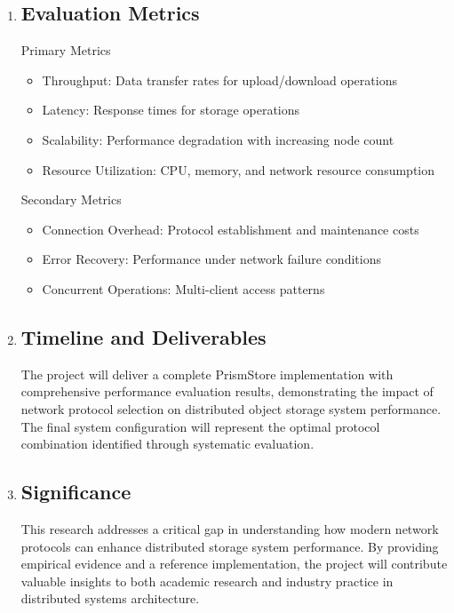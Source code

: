 \documentclass[12pt]{article}
\begin{document}
\begin{enumerate}
    \item \subsection*{Evaluation Metrics}
        Primary Metrics
        \begin{itemize}
            \item Throughput: Data transfer rates for upload/download operations
            \item Latency: Response times for storage operations
            \item Scalability: Performance degradation with increasing node count
            \item Resource Utilization: CPU, memory, and network resource consumption
        \end{itemize}
        Secondary Metrics
        \begin{itemize}
            \item Connection Overhead: Protocol establishment and maintenance costs
            \item Error Recovery: Performance under network failure conditions
            \item Concurrent Operations: Multi-client access patterns
        \end{itemize}

    \item \subsection*{Timeline and Deliverables}
        The project will deliver a complete PrismStore implementation with comprehensive performance evaluation results, demonstrating the impact of network protocol 
        selection on distributed object storage system performance. 
        The final system configuration will represent the optimal protocol combination identified through systematic evaluation.
    \item \subsection*{Significance}
        This research addresses a critical gap in understanding how modern network protocols can enhance distributed storage system performance. 
        By providing empirical evidence and a reference implementation, 
        the project will contribute valuable insights to both academic research and industry practice in distributed systems architecture.
\end{enumerate}

% 
% 
\end{document}
